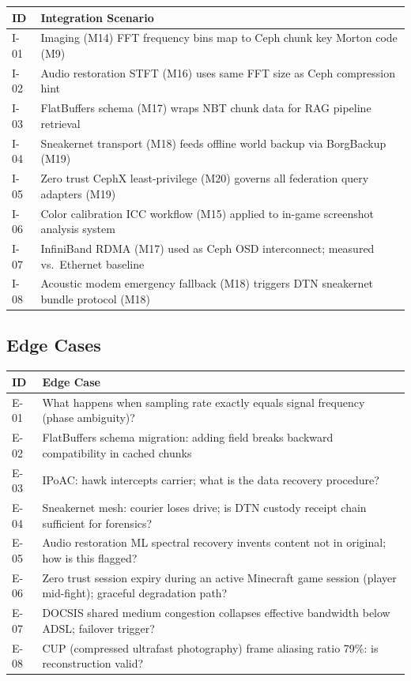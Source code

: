 \documentclass[11pt,letterpaper]{article}
\newcommand{\thead}[1]{\cellcolor{TableHead}\textbf{\sffamily\color{white}\small #1}}
\newcommand{\altrow}{\rowcolor{TableAlt}}
\begin{document}
\begin{longtable}{p{2cm}p{9cm}}
\toprule
\thead{ID} & \thead{Integration Scenario} \\
\midrule
\endhead
I-01 & Imaging (M14) FFT frequency bins map to Ceph chunk key Morton code (M9) \\
\altrow I-02 & Audio restoration STFT (M16) uses same FFT size as Ceph compression hint \\
I-03 & FlatBuffers schema (M17) wraps NBT chunk data for RAG pipeline retrieval \\
\altrow I-04 & Sneakernet transport (M18) feeds offline world backup via BorgBackup (M19) \\
I-05 & Zero trust CephX least-privilege (M20) governs all federation query adapters (M19) \\
\altrow I-06 & Color calibration ICC workflow (M15) applied to in-game screenshot analysis system \\
I-07 & InfiniBand RDMA (M17) used as Ceph OSD interconnect; measured vs.\ Ethernet baseline \\
\altrow I-08 & Acoustic modem emergency fallback (M18) triggers DTN sneakernet bundle protocol (M18) \\
\bottomrule
\end{longtable}

\subsection{Edge Cases}

\begin{longtable}{p{2cm}p{9cm}}
\toprule
\thead{ID} & \thead{Edge Case} \\
\midrule
\endhead
E-01 & What happens when sampling rate exactly equals signal frequency (phase ambiguity)? \\
\altrow E-02 & FlatBuffers schema migration: adding field breaks backward compatibility in cached chunks \\
E-03 & IPoAC: hawk intercepts carrier; what is the data recovery procedure? \\
\altrow E-04 & Sneakernet mesh: courier loses drive; is DTN custody receipt chain sufficient for forensics? \\
E-05 & Audio restoration ML spectral recovery invents content not in original; how is this flagged? \\
\altrow E-06 & Zero trust session expiry during an active Minecraft game session (player mid-fight); graceful degradation path? \\
E-07 & DOCSIS shared medium congestion collapses effective bandwidth below ADSL; failover trigger? \\
\altrow E-08 & CUP (compressed ultrafast photography) frame aliasing ratio 79\%: is reconstruction valid? \\
\bottomrule
\end{longtable}
\end{document}
